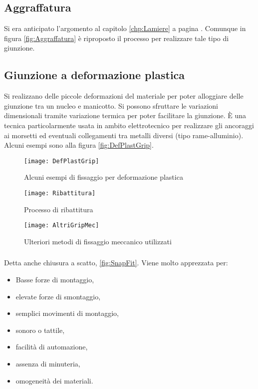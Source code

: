 \subsection{Aggraffatura}
Si era anticipato l'argomento al capitolo \ref{chp:Lamiere} a pagina \pageref{chp:Lamiere}.
Comunque in figura \ref{fig:Aggraffatura} è riproposto il processo per realizzare tale tipo di giunzione.

\subsection{Giunzione a deformazione plastica}
Si realizzano delle piccole deformazioni del materiale per poter alloggiare delle giunzione tra un nucleo e manicotto.
Si possono sfruttare le variazioni dimensionali tramite variazione termica per poter facilitare la giunzione.
È una tecnica particolarmente usata in ambito elettrotecnico per realizzare gli ancoraggi ai morsetti ed eventuali collegamenti tra metalli diversi (tipo rame-alluminio).
Alcuni esempi sono alla figura \ref{fig:DefPlastGrip}.

\begin{figure}
\centering
\texttt{[image: DefPlastGrip]}
\caption{Alcuni esempi di fissaggio per deformazione plastica}
\label{fig:DefPlastGrip}
\texttt{[image: Ribattitura]}
\caption{Processo di ribattitura}
\label{fig:Ribattitura}
\texttt{[image: AltriGripMec]}
\caption{Ulteriori metodi di fissaggio meccanico utilizzati}
\label{fig:AltriGripMec}
\end{figure}

\subsubsection{}
Detta anche chiusura a scatto, \ref{fig:SnapFit}. Viene molto apprezzata per:
\begin{itemize}
\item Basse forze di montaggio,
\item elevate forze di smontaggio,
\item semplici movimenti di montaggio,
\item {} sonoro o tattile,
\item facilità di automazione,
\item assenza di minuteria,
\item omogeneità dei materiali.
\end{itemize}

